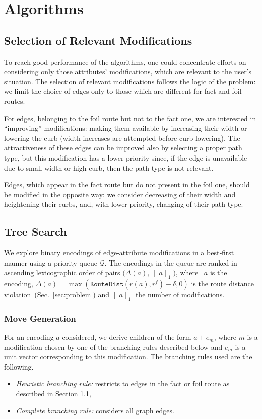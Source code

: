 \documentclass{article}
\begin{document}
\section{Algorithms}
\label{sec:algorithms}

\subsection{Selection of Relevant Modifications}
\label{sec:heuristic_policy}
To reach good performance of the algorithms, one could concentrate efforts on considering only those attributes' modifications, which are relevant to the user's situation.
The selection of relevant modifications follows the logic of the problem: we limit the choice of edges only to those which are different for fact and foil routes.

For edges, belonging to the foil route but not to the fact one, we are interested in ``improving'' modifications: making them available by increasing their width or lowering the curb (width increases are attempted before curb‑lowering).
The attractiveness of these edges can be improved also by selecting a proper path type, but this modification has a lower priority since, if the edge is unavailable due to small width or high curb, then the path type is not relevant.

Edges, which appear in the fact route but do not present in the foil one, should be modified in the opposite way: we consider decreasing of their width and heightening their curbs, and, with lower priority, changing of their path type.


\subsection{Tree Search}
\label{sec:tree-search}

We explore binary encodings of edge-attribute modifications in a best‐first manner using a priority queue $\mathcal Q$.  
The encodings in the queue are ranked in ascending lexicographic order of pairs $\bigl(\Delta(a),\,\|a\|_1\bigr)$, where ~$a$ is the encoding, $\Delta(a)=\max(\mathtt{RouteDist}(r(a),r^f) - \delta, 0)$ is the route distance violation~(Sec.~\ref{sec:problem}) and $\|a\|_1$ the number of modifications.

\subsubsection{Move Generation}
For an encoding $a$ considered, we derive children of the form $a + e_m$, where $m$ is a modification chosen by one of the branching rules described below and $e_m$ is a unit vector corresponding to this modification.
The branching rules used are the following.
\begin{itemize}
  \item \emph{Heuristic branching rule:} restricts to edges in the fact or foil route as described in Section \ref{sec:heuristic_policy},
  \item \emph{Complete branching rule:} considers all graph edges.
\end{itemize}
\end{document}
